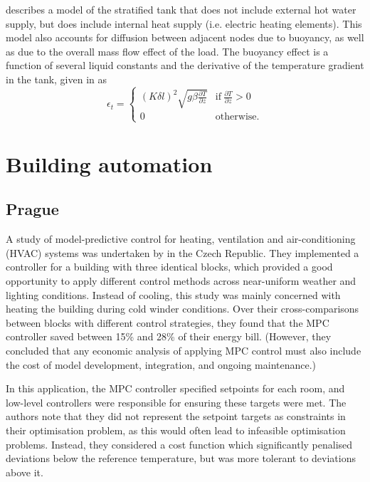 \textcite{Pfeiffer11} describes a model of the stratified tank that does not include external hot water supply, but does include internal heat supply (i.e. electric heating elements).
This model also accounts for diffusion between adjacent nodes due to buoyancy, as well as due to the overall mass flow effect of the load.
The buoyancy effect is a function of several liquid constants and the derivative of the temperature gradient in the tank, given in \textcite{Hawlader88} as
$$ \epsilon_t = \left\{ \begin{array}{ll}
   (K \delta l)^2 \sqrt{g \beta \frac{\partial T}{\partial z}} & \text{if}\ \frac{\partial T}{\partial z} > 0 \\
   0 & \text{otherwise}.
\end{array} \right. $$

\section{Building automation}

\subsection{Prague}

A study of model-predictive control for heating, ventilation and
air-conditioning (HVAC) systems was undertaken by \textcite{Siroky11} in the Czech Republic.
They implemented a controller for a building with three identical blocks, which provided a good opportunity to apply different control methods across near-uniform weather and lighting conditions.
Instead of cooling, this study was mainly concerned with heating the building during cold winder conditions.
Over their cross-comparisons between blocks with different control strategies, they found that the MPC controller saved between 15\% and 28\% of their energy bill.
(However, they concluded that any economic analysis of applying MPC control must also include the cost of model development, integration, and ongoing maintenance.)

In this application, the MPC controller specified setpoints for each room, and low-level controllers were responsible for ensuring these targets were met.
The authors note that they did not represent the setpoint targets as constraints in their optimisation problem, as this would often lead to infeasible optimisation problems.
Instead, they considered a cost function which significantly penalised deviations below the reference temperature, but was more tolerant to deviations above it.

